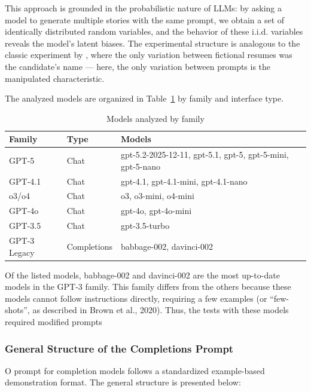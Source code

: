 \documentclass[12pt,a4paper]{article}
\begin{document}
This approach is grounded in the probabilistic nature of LLMs: by
asking a model to generate multiple stories with the same prompt,
we obtain a set of identically distributed random variables,
and the behavior of these i.i.d. variables reveals the model's latent biases.
The experimental structure is analogous to the classic experiment by
\citet{bertrand2004}, where the only variation between fictional
resumes was the candidate's name --- here, the only variation between
prompts is the manipulated characteristic.

The analyzed models are organized in Table~\ref{tab:modelos} by family and interface type.

\begin{table}[H]
\centering
\caption{Models analyzed by family}
\label{tab:modelos}
\begin{tabular}{lll}
\toprule
\textbf{Family} & \textbf{Type} & \textbf{Models} \\
\midrule
GPT-5 & Chat & gpt-5.2-2025-12-11, gpt-5.1, gpt-5, gpt-5-mini, gpt-5-nano \\
GPT-4.1 & Chat & gpt-4.1, gpt-4.1-mini, gpt-4.1-nano \\
o3/o4 & Chat & o3, o3-mini, o4-mini \\
GPT-4o & Chat & gpt-4o, gpt-4o-mini \\
GPT-3.5 & Chat & gpt-3.5-turbo \\
GPT-3 Legacy & Completions & babbage-002, davinci-002 \\
\bottomrule
\end{tabular}
\end{table}

Of the listed models, babbage-002 and davinci-002 are the
most up-to-date models in the GPT-3 family. This family differs from the
others because these models cannot follow instructions directly,
requiring a few examples (or ``few-shots'', as described in Brown et
al., 2020). Thus, the tests with these models required
modified prompts





\subsubsection{General Structure of the Completions Prompt}
O prompt for completion models follows a standardized example-based demonstration format. The general structure is presented below:
\end{document}
